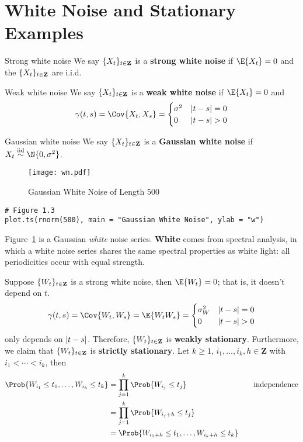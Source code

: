 \section{White Noise and Stationary Examples}
\begin{Definition}{Strong white noise}{}
    We say $ \{X_t\}_{t\in\mathbf{Z}} $ is a
    \textbf{strong white noise} if $ \E{X_t}=0 $
    and the $ \{X_t\}_{t\in\mathbf{Z}} $ are i.i.d.
\end{Definition}
\begin{Definition}{Weak white noise}{}
    We say $ \{X_t\}_{t\in\mathbf{Z}} $ is a
    \textbf{weak white noise} if $ \E{X_t}=0 $
    and
    \[ \gamma(t,s)=\Cov{X_t,X_s}=\begin{cases}
            \sigma^2 & \abs{t-s}=0 \\
            0        & \abs{t-s}>0
        \end{cases} \]
\end{Definition}
\begin{Definition}{Gaussian white noise}{}
    We say $ \{X_t\}_{t\in\mathbf{Z}} $ is a
    \textbf{Gaussian white noise}
    if $ X_t\stackrel{\text{iid}}{\sim}\N{0,\sigma^2} $.
\end{Definition}
\begin{figure}[!ht]
    \centering
    \texttt{[image: wn.pdf]}
    \caption{Gaussian White Noise of Length 500}\label{fig:wn}
\end{figure}
\begin{verbatim}
# Figure 1.3
plot.ts(rnorm(500), main = "Gaussian White Noise", ylab = "w")
\end{verbatim}
Figure~\ref{fig:wn} is a Gaussian \emph{white} noise series.
\textbf{White} comes from spectral analysis,
in which a white noise series shares the same spectral properties as white light:
all periodicities occur with equal strength.
\begin{Example}{}{}
    Suppose $ \{W_t\}_{t\in\mathbf{Z}} $
    is a strong white noise, then $ \E{W_t}=0 $;
    that is, it doesn't depend on $ t $.
    \[ \gamma(t,s)=\Cov{W_t,W_s}=\E{W_t W_s}=
        \begin{cases}
            \sigma_W^2 & \abs{t-s}=0 \\
            0          & \abs{t-s}>0
        \end{cases} \]
    only depends on $ \lvert t-s\rvert $. Therefore,
    $ \{W_t\}_{t\in\mathbf{Z}} $ is
    \textbf{weakly stationary}. Furthermore,
    we claim that
    $ \{W_t\}_{t\in\mathbf{Z}} $ is
    \textbf{strictly stationary}. Let $ k\ge 1 $,
    $ i_1,\ldots,i_k,h\in\mathbf{Z} $ with $ i_1<\cdots<i_k $, then
    \begin{align*}
        \Prob{W_{i_1}\le t_1,\ldots,W_{i_k}\le t_k}
         & =\prod_{j=1}^k\Prob{W_{i_j}\le t_j}                   & \quad & \text{independence} \\
         & =\prod_{j=1}^k\Prob{W_{{i_j}+h}\le t_j}                                             \\
         & =\Prob{W_{{i_1}+h}\le t_1,\ldots, W_{{i_k}+h}\le t_k}
    \end{align*}
\end{Example}
